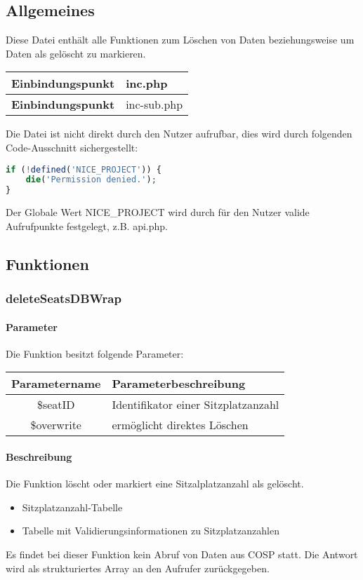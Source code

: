 \subsection{Allgemeines} Diese Datei enthält alle Funktionen zum Löschen von Daten beziehungsweise um Daten als gelöscht zu markieren.
\begin{table}[H]
	\begin{tabular}{|c|p{11cm}|}
		\hline
		\textbf{Einbindungspunkt} & inc.php \\ \hline
		\textbf{Einbindungspunkt} & inc-sub.php \\ \hline
	\end{tabular}
\end{table}
Die Datei ist nicht direkt durch den Nutzer aufrufbar, dies wird durch folgenden Code-Ausschnitt sichergestellt:
\begin{lstlisting}[language=php]
if (!defined('NICE_PROJECT')) {
	die('Permission denied.');
}
\end{lstlisting}
Der Globale Wert {\glqq NICE\_PROJECT\grqq} wird durch für den Nutzer valide Aufrufpunkte festgelegt, z.B. {\glqq api.php\grqq}.
\newpage
\subsection{Funktionen}
\subsubsection{deleteSeatsDBWrap}
\paragraph{Parameter} Die Funktion besitzt folgende Parameter:
\begin{table}[H]
	\begin{tabular}{|c|p{11cm}|}
		\hline
		\textbf{Parametername} & \textbf{Parameterbeschreibung} \\ \hline
		\$seatID    & Identifikator einer Sitzplatzanzahl \\ \hline
		\$overwrite & ermöglicht direktes Löschen \\ \hline
	\end{tabular}
\end{table}
\paragraph{Beschreibung} Die Funktion löscht oder markiert eine Sitzalplatzanzahl als gelöscht.
\begin{itemize}
	\item Sitzplatzanzahl-Tabelle
	\item Tabelle mit Validierungsinformationen zu Sitzplatzanzahlen
\end{itemize}
Es findet bei dieser Funktion kein Abruf von Daten aus {\glqq COSP\grqq} statt. Die Antwort wird als strukturiertes Array an den Aufrufer zurückgegeben.
